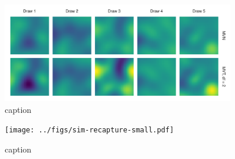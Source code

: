 \documentclass[12pt,english]{article}
\begin{document}
\begin{spacing}{1.05}
\begin{figure}[htb]
\begin{center}
  \includegraphics[width=0.9\textwidth]{../figs/nu-rf-illustration.pdf}
\caption{caption}
\label{fig:didactic}
\end{center}
\end{figure}

\begin{figure}[htb]
\begin{center}
  \texttt{[image: ../figs/sim-recapture-small.pdf]}
\caption{caption}
\label{fig:didactic}
\end{center}
\end{figure}


\end{spacing}
\end{document}
